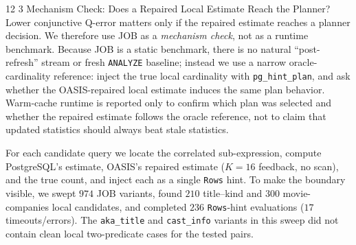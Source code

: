 \documentclass[preprint,12pt]{elsarticle}
\makeatletter
\renewcommand\subsection{\@startsection{subsection}{2}{\z@}%
           {12\p@ \@plus 6\p@ \@minus 3\p@}%
           {3\p@ \@plus 6\p@ \@minus 3\p@}%
           {\normalfont\normalsize\bfseries}}
\makeatother
\begin{document}
\subsection{Mechanism Check: Does a Repaired Local Estimate Reach the Planner?}
\label{sec:plan-level}
Lower conjunctive Q-error matters only if the repaired estimate reaches a planner decision.
We therefore use JOB as a \emph{mechanism check}, not as a runtime benchmark. Because JOB is a
static benchmark, there is no natural ``post-refresh'' stream or fresh \texttt{ANALYZE}
baseline; instead we use a narrow oracle-cardinality reference: inject the true local
cardinality with \texttt{pg\_hint\_plan}, and ask whether the OASIS-repaired local estimate
induces the same plan behavior. Warm-cache runtime is reported only to confirm which plan was
selected and whether the repaired estimate follows the oracle reference, not to claim that
updated statistics should always beat stale statistics.

For each candidate query we locate the correlated sub-expression, compute PostgreSQL's
estimate, OASIS's repaired estimate ($K{=}16$ feedback, no scan), and the true count, and inject
each as a single \texttt{Rows} hint. To make the boundary visible, we swept $974$ JOB variants,
found $210$ title--kind and $300$ movie-companies local candidates, and completed $236$
\texttt{Rows}-hint evaluations ($17$ timeouts/errors). The \texttt{aka\_title} and
\texttt{cast\_info} variants in this sweep did not contain clean local two-predicate cases for
the tested pairs.
\end{document}
